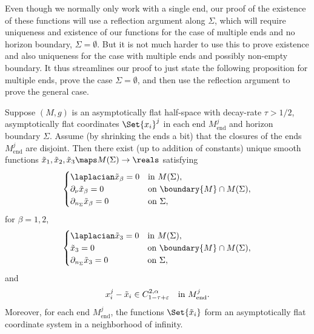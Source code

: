 \documentclass[titlepage,numbers=noenddot,headinclude,oneside,%
footinclude=true,cleardoublepage=empty,%
BCOR=5mm,paper=a4,fontsize=11pt,%
english,%
]{scrartcl}
\newcommand{\Mend}{M_{\mathrm{end}}} %
\begin{document}

Even though we normally only work with a single end, our proof of the existence of these functions will use a reflection argument along \( \Sigma \), which will require uniqueness and existence of our functions for the case of multiple ends and no horizon boundary, \ie \( \Sigma=\emptyset \). But it is not much harder to use this to prove existence and also uniqueness for the case with multiple ends and possibly non-empty boundary. It thus streamlines our proof to just state the following proposition for multiple ends, prove the case \( \Sigma=\emptyset \), and then use the reflection argument to prove the general case.
\begin{proposition}\label{prop:existence_and_uniqueness}
    Suppose \( (M,g) \) is an asymptotically flat half-space with decay-rate \( \tau>1/2 \), asymptotically flat coordinates \( \Set{x_i}^j \) in each end \( \Mend^j \) and horizon boundary \( \Sigma \). Assume (\eg by shrinking the ends a bit) that the closures of the ends \( \Mend^j \) are disjoint. Then there exist (up to addition of constants) unique smooth functions \( \tilde{x}_1,\tilde{x}_2,\tilde{x}_3\maps M(\Sigma)\to \reals \) satisfying
    \begin{equation*}
        \begin{cases}
            \laplacian \tilde{x}_\beta=0& \text{in \( M(\Sigma) \)},\\
            \partial_\nu \tilde{x}_\beta=0& \text{on \( \boundary{M}\cap M(\Sigma) \)},\\
            \partial_{n_\Sigma}\tilde{x}_\beta=0&\text{on \( \Sigma \)},
        \end{cases}
    \end{equation*}
    for \( \beta=1,2 \),
    \begin{equation*}
        \begin{cases}
            \laplacian \tilde{x}_3=0& \text{in \( M(\Sigma) \)},\\
            \tilde{x}_3=0& \text{on \( \boundary{M}\cap M(\Sigma) \)},\\
            \partial_{n_{\Sigma}}\tilde{x}_3=0& \text{on \( \Sigma \)},
        \end{cases}
    \end{equation*}
    and
    \begin{equation*}
        x_i^j-\tilde{x}_i\in C_{1-\tau+\varepsilon}^{2,\alpha} \quad \text{in \( \Mend^j \)}.
    \end{equation*}
    Moreover, for each end \( \Mend^j \), the functions \( \Set{\tilde{x}_i} \) form an asymptotically flat coordinate system in a neighborhood of infinity.
\end{proposition} 
\end{document}
